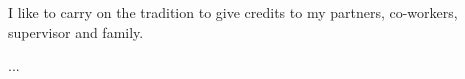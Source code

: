 I like to carry on the tradition to give credits to my partners, co-workers, supervisor and family.

...